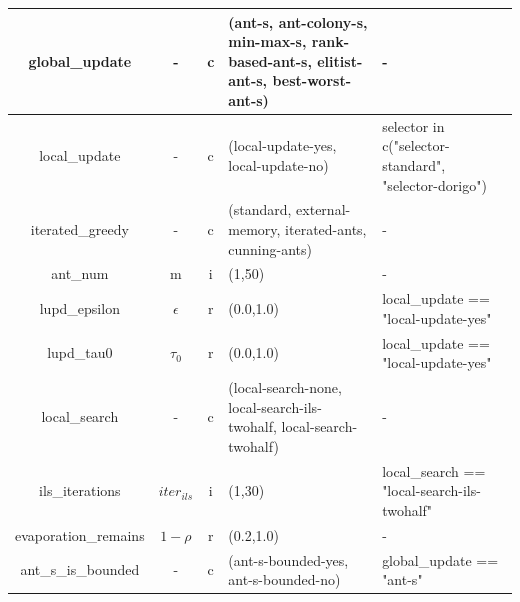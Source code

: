 \documentclass[12pt,a4paper,oneside]{book}
\begin{document}
\begin{table}[]
\begin{tabular}{|c|c|c|p{4cm}|p{4cm}|}
global\_update                  & -          & c    & (ant-s, ant-colony-s, min-max-s, rank-based-ant-s, elitist-ant-s, best-worst-ant-s) & -                                                                                             \\ \hline
local\_update                   & -          & c    & (local-update-yes, local-update-no)                                             & selector in c("selector-standard", "selector-dorigo")                                          \\ \hline
iterated\_greedy                & -          & c    & (standard, external-memory, iterated-ants, cunning-ants)                          & -                                                                                             \\ \hline
ant\_num                        & m          & i    & (1,50)                                                                         & -                                                                                             \\ \hline
lupd\_epsilon                   & $\epsilon$ & r    & (0.0,1.0)                                                                      & local\_update == "local-update-yes"                                                           \\ \hline
lupd\_tau0                      & $\tau_0$   & r    & (0.0,1.0)                                                                      & local\_update == "local-update-yes"                                                           \\ \hline
local\_search                   & -          & c    & (local-search-none, local-search-ils-twohalf, local-search-twohalf)              & -                                                                                             \\ \hline
ils\_iterations                 & $iter_{ils}$ & i    & (1,30)                                                                         & local\_search == "local-search-ils-twohalf"                                                   \\ \hline
evaporation\_remains            & $1-\rho$   & r    & (0.2,1.0)                                                                      & -                                                                                             \\ \hline
ant\_s\_is\_bounded             & -          & c    & (ant-s-bounded-yes, ant-s-bounded-no)                                           & global\_update == "ant-s"                                                                     \\ \hline
\end{tabular}
\end{table}
\end{document}
